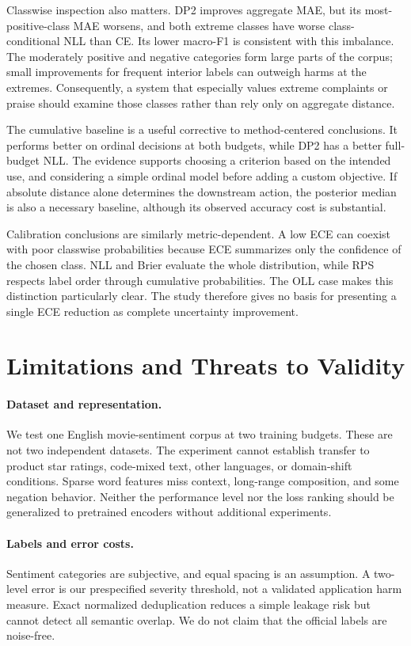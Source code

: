 \documentclass[10pt,twocolumn]{article}
\begin{document}
Classwise inspection also matters. DP2 improves aggregate MAE, but its most-positive-class MAE worsens, and both extreme classes have worse class-conditional NLL than CE. Its lower macro-F1 is consistent with this imbalance. The moderately positive and negative categories form large parts of the corpus; small improvements for frequent interior labels can outweigh harms at the extremes. Consequently, a system that especially values extreme complaints or praise should examine those classes rather than rely only on aggregate distance.

The cumulative baseline is a useful corrective to method-centered conclusions. It performs better on ordinal decisions at both budgets, while DP2 has a better full-budget NLL. The evidence supports choosing a criterion based on the intended use, and considering a simple ordinal model before adding a custom objective. If absolute distance alone determines the downstream action, the posterior median is also a necessary baseline, although its observed accuracy cost is substantial.

Calibration conclusions are similarly metric-dependent. A low ECE can coexist with poor classwise probabilities because ECE summarizes only the confidence of the chosen class. NLL and Brier evaluate the whole distribution, while RPS respects label order through cumulative probabilities. The OLL case makes this distinction particularly clear. The study therefore gives no basis for presenting a single ECE reduction as complete uncertainty improvement.

\section{Limitations and Threats to Validity}
\paragraph{Dataset and representation.} We test one English movie-sentiment corpus at two training budgets. These are not two independent datasets. The experiment cannot establish transfer to product star ratings, code-mixed text, other languages, or domain-shift conditions. Sparse word features miss context, long-range composition, and some negation behavior. Neither the performance level nor the loss ranking should be generalized to pretrained encoders without additional experiments.

\paragraph{Labels and error costs.} Sentiment categories are subjective, and equal spacing is an assumption. A two-level error is our prespecified severity threshold, not a validated application harm measure. Exact normalized deduplication reduces a simple leakage risk but cannot detect all semantic overlap. We do not claim that the official labels are noise-free.
\end{document}
